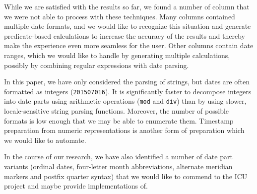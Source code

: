 While we are satisfied with the results so far, we found a number of column that we were not able to process with these techniques. Many columns contained multiple date formats, and we would like to recognize this situation and generate predicate-based calculations to increase the accuracy of the results and thereby make the experience even more seamless for the user. Other columns contain date ranges, which we would like to handle by generating multiple calculations, possibly by combining regular expressions with date parsing.

In this paper, we have only considered the parsing of strings, but dates are often formatted as integers (\eg \texttt{201507016}). It is significantly faster to decompose integers into date parts using arithmetic operations (\eg \texttt{mod} and \texttt{div}) than by using slower, locale-sensitive string parsing functions. Moreover, the number of possible formats is low enough that we may be able to enumerate them. Timestamp preparation from numeric representations is another form of preparation which we would like to automate.

In the course of our research, we have also identified a number of date part variants (\eg ordinal dates, four-letter month abbreviations, alternate meridian markers and postfix quarter syntax) that we would like to commend to the ICU project and maybe provide implementations of.
